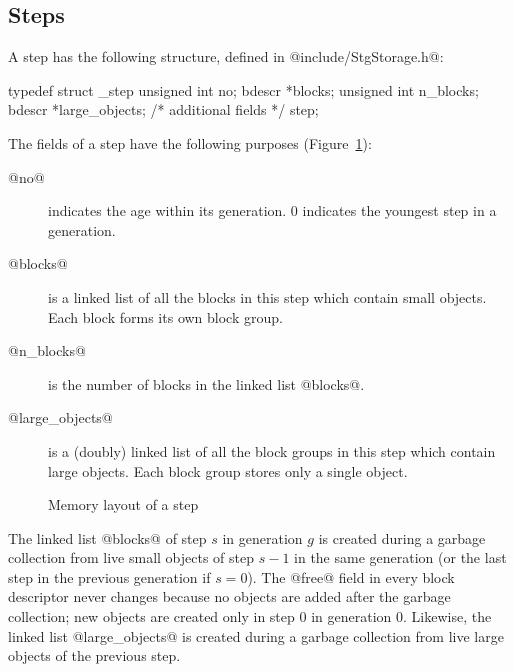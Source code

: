 \documentclass{article}
\begin{document}
\subsection{Steps}

A step has the following structure, defined in 
@include/StgStorage.h@:

\begin{code}
typedef struct _step {
  unsigned int no;
  bdescr *blocks;
  unsigned int n_blocks;
  bdescr *large_objects;
  /* additional fields */
} step;
\end{code}

The fields of a step have the following purposes (Figure~\ref{fig-step}):

\begin{description}
\item[@no@] indicates the age within its generation. 
$0$ indicates the youngest step in a generation.
\item[@blocks@] is a linked list of all the blocks in this step 
which contain small objects.
Each block forms its own block group.
\item[@n\_blocks@] is the number of blocks in the linked list @blocks@.
\item[@large\_objects@] is a (doubly) linked list of all the block groups 
in this step which contain large objects. 
Each block group stores only a single object.
\end{description}

\begin{figure}[ht]
\begin{center}

\caption{Memory layout of a step}
\label{fig-step}
\end{center}
\end{figure}

The linked list @blocks@ of step $s$ in generation $g$ is created 
during a garbage collection
from live small objects of step $s - 1$ in the same generation 
(or the last step in the previous generation if $s = 0$).
The @free@ field in every block descriptor never changes because
no objects are added after the garbage collection; new objects are created 
only in step $0$ in generation $0$.
Likewise, the linked list @large_objects@ is created during a
garbage collection from live large objects of the previous step. 
\end{document}
